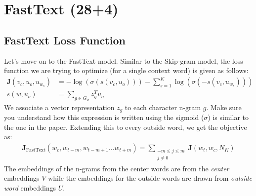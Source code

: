 \documentclass{assignment format}
\begin{document}
\section{FastText (28+4)}
\subsection{FastText Loss Function}
Let's move on to the FastText model.
Similar to the Skip-gram model, the loss function we are trying to optimize (for a single context word) is given as follows:
\begin{align*}
    \bm J(v_c, u_o, u_{w_s}) &= - \log(\sigma(s(v_c, u_o)))  - \sum_{s=1}^K \log(\sigma(-s(v_c, u_{w_s}))) \\
    s(w, u_o) &= \sum_{g \in G_w} z_g^T u_o
\end{align*}
We associate a vector representation $z_g$ to each character n-gram $g$. 
Make sure you understand how this expression is written using the sigmoid ($\sigma$) is similar to the one in the paper. 
Extending this to every outside word, we get the objective as:
\begin{align*}
    \bm J_{\text{FastText}}(w_c, w_{t-m}, w_{t-m+1} \dots w_{t+m}) = \sum_{\substack{-m\le j \le m \\ j\ne 0}} \bm J(w_t, w_c, N_K)
\end{align*}
The embeddings of the n-grams from the center words are from the  \textit{center} embeddings $V$ while the embeddings for the outside words are drawn from  \textit{outside word} embeddings $U$. 
\end{document}
